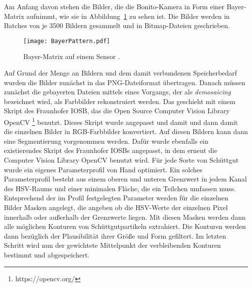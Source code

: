 Am Anfang davon stehen die Bilder, die die Bonito-Kamera in Form einer Bayer-Matrix aufnimmt, wie sie in Abbildung~\ref{fig:bayerPattern} zu sehen ist.
Die Bilder werden in Batches von je 3500 Bildern gesammelt und in Bitmap-Dateien geschrieben.
\begin{figure}[h]
	\centering
	\texttt{[image: BayerPattern.pdf]}
	\caption{Bayer-Matrix auf einem Sensor \cite{bayerPattern06}.}
	\label{fig:bayerPattern}
\end{figure}
Auf Grund der Menge an Bildern und dem damit verbundenen Speicherbedarf wurden die Bilder zunächst in das PNG-Dateiformat übertragen.
Danach müssen zunächst die gebayerten Dateien mittels eines Vorgangs, der als \textit{demosaicing} bezeichnet wird,
als Farbbilder rekonstruiert werden.
Das geschieht mit einem Skript des Fraunhofer IOSB, das die Open Source Computer Vision Library OpenCV \footnote{https://opencv.org/} benutzt.
Dieses Skript wurde angepasst und damit und dann damit die einzelnen Bilder in RGB-Farbbilder konvertiert.
Auf diesen Bildern kann dann eine Segmentierung vorgenommen werden.
Dafür wurde ebenfalls ein existierendes Skript des Fraunhofer IOSBs angepasst, in dem erneut die Computer Vision Library OpenCV benutzt wird.
Für jede Sorte von Schüttgut wurde ein eigenes Parameterprofil von Hand optimiert.
Ein solches Parameterprofil besteht aus einem oberen und unteren Grenzwert in jedem Kanal des HSV-Raums und einer minimalen Fläche, die ein Teilchen umfassen muss.
Entsprechend der im Profil festgelegten Parameter werden für die einzelnen Bilder Masken angelegt,
die angeben ob die HSV-Werte der einzelnen Pixel innerhalb oder außerhalb der Grenzwerte liegen. 
Mit diesen Masken werden dann alle möglichen Konturen von Schüttgutpartikeln extrahiert. 
Die Konturen werden dann bezüglich der Plausibilität ihrer Größe und Form gefiltert. 
Im letzten Schritt wird nun der gewichtete Mittelpunkt der verbleibenden Konturen bestimmt und abgespeichert.


